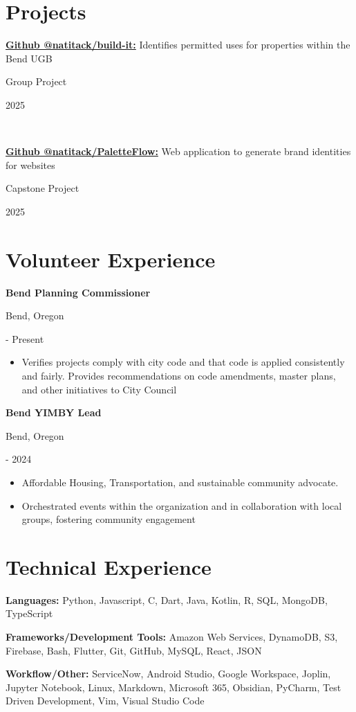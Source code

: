 \documentclass[10pt]{article}
\newcommand{\triline}[3]{%
    \parbox[t][][t]{.4\linewidth}{ #1 }%
    \parbox[t][][t]{.4\linewidth}{ #2 }%
    \parbox[t][][t]{.2\linewidth}{\raggedleft #3 }%
    \vspace{1ex}
}
\newcommand{\publication}[3]{%
    \parbox[t][][t]{.8\linewidth}{ #1 }%
    \parbox[t][][t]{.05\linewidth}{ #2 }%
    \parbox[t][][t]{.15\linewidth}{\raggedright #3 }%
    \vspace{0.5ex}
}
\newlength{\listpostvertical}
\begin{document}
\section{Projects}

\publication%
    {
    \textbf{ 
    \href{https://github.com/natitack/build-it}%
          {Github @natitack/build-it:}} Identifies permitted uses for properties within the Bend UGB}%

    {Group Project}%
    {2025}
    \\
\publication%
    {
    \textbf{ 
    \href{https://github.com/natitack/PaletteFlow}%
          {Github @natitack/PaletteFlow:}} Web application to generate brand identities for websites}%

    {Capstone Project}%
    {2025}

\section{Volunteer Experience}

    \triline{\textbf{Bend Planning Commissioner}}{Bend, Oregon}{ 2024 - Present}
    \vspace{\listpostvertical}
    
    \begin{itemize}[nosep]
    \item Verifies projects comply with city code and that code is applied consistently and fairly. Provides recommendations on code amendments, master plans, and other initiatives to City Council
    \end{itemize}

    \vspace{\listpostvertical}


    \triline{\textbf{Bend YIMBY Lead}}{Bend, Oregon}{2021 - 2024}
    \begin{itemize}[nosep]
    \item Affordable Housing, Transportation, and sustainable community advocate. 
    \item Orchestrated events within the organization and in collaboration with local groups, fostering community engagement
    
    \end{itemize}
    \vspace{\listpostvertical}
    


\section{Technical Experience}

\begin{trivlist}
    \item \textbf{Languages:} Python, Javascript, C, Dart, Java, Kotlin, R, SQL, MongoDB, TypeScript
    \item \textbf{Frameworks/Development Tools:} Amazon Web Services, DynamoDB, S3, Firebase, Bash, Flutter, Git, GitHub, MySQL, React, JSON
    \item \textbf{Workflow/Other:} ServiceNow, Android Studio, Google Workspace, Joplin, Jupyter Notebook, Linux, Markdown, Microsoft 365, Obsidian, PyCharm, Test Driven Development, 
    Vim, Visual Studio Code
\end{trivlist}
\end{document}
